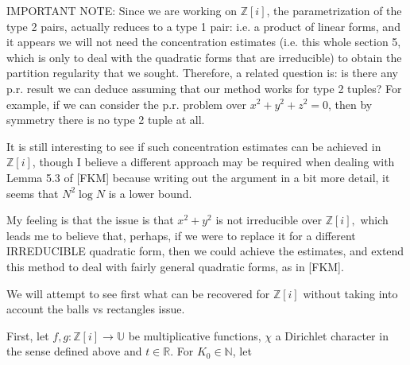 \documentclass[11pt]{amsart}
\theoremstyle{definition}
\newcommand{\N}{{\mathbb N}}
\newcommand{\R}{{\mathbb R}}
\newcommand{\Z}{{\mathbb Z}}
\newcommand{\U}{{\mathbb U}}
\begin{document}
{\color{red} IMPORTANT NOTE: Since we are working on $\Z[i]$, the parametrization of the type 2 pairs, actually reduces to a type 1 pair: i.e. a product of linear forms, and it appears we will not need the concentration estimates (i.e. this whole section 5, which is only to deal with the quadratic forms that are irreducible) to obtain the partition regularity that we sought. 
{\color{blue} Therefore, a related question is: is there any p.r. result we can deduce assuming that our method works for type 2 tuples? For example, if we can consider the p.r. problem over $x^{2}+y^{2}+z^{2}=0$, then by symmetry there is no type 2 tuple at all.
}

It is still interesting to see if such concentration estimates can be achieved in $\Z[i]$, though I believe a different approach may be required when dealing with Lemma 5.3 of [FKM] because writing out the argument in a bit more detail, it seems that $N^2\log N$ is a lower bound.

My feeling is that the issue is that $x^2+y^2$ is not irreducible over $\Z[i],$ which leads me to believe that, perhaps, if we were to replace it for a different IRREDUCIBLE quadratic form, then we could achieve the estimates, and extend this method to deal with fairly general quadratic forms, as in [FKM].
}
We will attempt to see first what can be recovered for $\Z[i]$ without taking into account the balls vs rectangles issue.

First, let $f, g:\Z[i] \to \U$ be multiplicative functions, $\chi$ a Dirichlet character in the sense defined above and $t\in \R$. For $K_0 \in \N$, let
\end{document}
